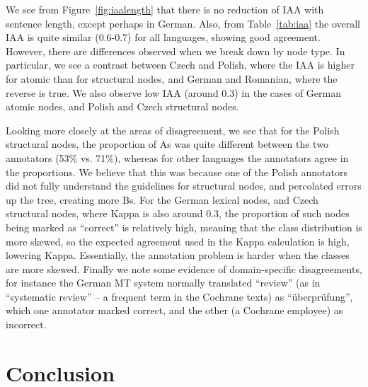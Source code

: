 \documentclass[11pt]{article}
\newcommand{\figref}[1]{Figure~\ref{#1}}
\newcommand{\tabref}[1]{Table~\ref{#1}}
\begin{document}
We see from \figref{fig:iaalength} that there is no reduction of IAA with sentence
length, except perhaps in German. Also, from \tabref{tab:iaa} the overall IAA
is quite similar (0.6-0.7) for all languages, showing good agreement.
However, there are differences observed when we break down by node type.
In particular, we see a contrast  between
Czech and Polish, where the IAA is higher for atomic than for structural nodes, and German and Romanian,
where the reverse is true. We also observe low IAA (around 0.3) in the cases of
German atomic nodes, and Polish and Czech structural nodes.

Looking more closely at the areas of disagreement, we see that for the Polish structural nodes, the 
proportion of As was quite different between the two annotators (53\% vs. 71\%), whereas for other
languages the annotators agree in the proportions. We believe that this was because one of the Polish
annotators did not fully understand the guidelines for structural nodes, and percolated
errors up the tree, creating more Bs. For the German lexical nodes, and Czech structural nodes, where
Kappa is also around 0.3, the proportion of such nodes being marked as ``correct'' is relatively 
high, meaning that the class distribution is more skewed, so the expected agreement used in the
Kappa calculation is high, lowering Kappa. Essentially, the annotation problem is harder when the classes
are more skewed. Finally we note some evidence of domain-specific disagreements, for instance the German
MT system normally translated ``review'' (as in ``systematic review'' -- a frequent term in the 
Cochrane texts) as ``\"uberpr\"ufung'', which 
one annotator marked correct, and the other (a Cochrane employee)  as incorrect.






\section{Conclusion}\label{sec:conclusion}
\end{document}
